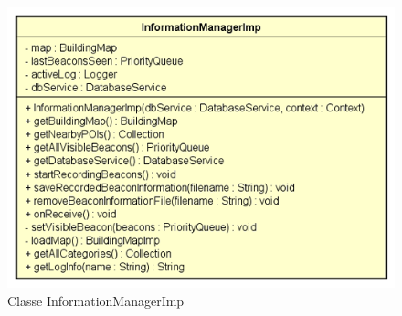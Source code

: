 \documentclass[../DefinizioneDiProdotto.tex]{subfiles}
\begin{document}
    \begin{figure}[H]
        \centering
        \includegraphics{img/InformationManagerImp.png}
        \caption{Classe InformationManagerImp}\label{fig:model::InformationManagerImp} 
    \end{figure}
\end{document}
